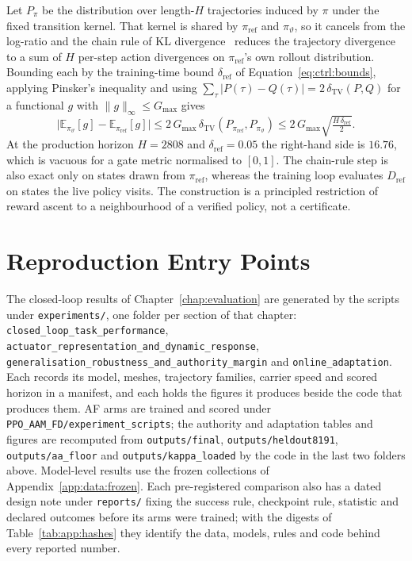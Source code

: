 Let $P_\pi$ be the distribution over length-$H$ trajectories induced by $\pi$
under the fixed transition kernel. That kernel is shared by
$\pi_{\mathrm{ref}}$ and $\pi_\vartheta$, so it cancels from the log-ratio and
the chain rule of KL divergence~\cite{cover2006information} reduces the
trajectory divergence to a sum of $H$ per-step action divergences on
$\pi_{\mathrm{ref}}$'s own rollout distribution. Bounding each by the
training-time bound $\delta_{\mathrm{ref}}$ of
Equation~\eqref{eq:ctrl:bounds}, applying Pinsker's inequality and using
$\sum_\tau |P(\tau)-Q(\tau)| = 2\,\delta_{\mathrm{TV}}(P,Q)$ for a functional
$g$ with $\|g\|_\infty \le G_{\max}$ gives
%
\begin{equation}
  \bigl|\mathbb{E}_{\pi_\vartheta}[g] - \mathbb{E}_{\pi_{\mathrm{ref}}}[g]\bigr|
  \le 2\,G_{\max}\,
     \delta_{\mathrm{TV}}(P_{\pi_{\mathrm{ref}}}, P_{\pi_\vartheta})
  \le 2\,G_{\max}\sqrt{\tfrac{H\,\delta_{\mathrm{ref}}}{2}} .
  \label{eq:app:final-bound}
\end{equation}
%
At the production horizon $H = 2808$ and $\delta_{\mathrm{ref}} = 0.05$ the
right-hand side is $16.76$, which is vacuous for a gate metric normalised to
$[0,1]$. The chain-rule step is also exact only on states drawn from
$\pi_{\mathrm{ref}}$, whereas the training loop evaluates $D_{\mathrm{ref}}$ on
states the live policy visits. The construction is a principled restriction of
reward ascent to a neighbourhood of a verified policy, not a certificate.

\section{Reproduction Entry Points}
\label{app:repro}

\sloppypar
The closed-loop results of Chapter~\ref{chap:evaluation} are generated by the
scripts under \texttt{experiments/}, one folder per section of that chapter:
\texttt{closed\_loop\_task\_performance},
\texttt{actuator\_representation\_and\_dynamic\_response},
\texttt{generalisation\_robustness\_and\_authority\_margin} and
\texttt{online\_adaptation}. Each records its model, meshes, trajectory
families, carrier speed and scored horizon in a manifest, and each holds the
figures it produces beside the code that produces them. AF arms are trained
and scored under \texttt{PPO\_AAM\_FD/experiment\_scripts}; the authority and
adaptation tables and figures are recomputed from \texttt{outputs/final},
\texttt{outputs/heldout8191}, \texttt{outputs/aa\_floor} and
\texttt{outputs/kappa\_loaded} by the code in the last two folders above. Model-level results use the frozen collections of
Appendix~\ref{app:data:frozen}. Each pre-registered comparison also has a dated
design note under \texttt{reports/} fixing the success rule, checkpoint rule,
statistic and declared outcomes before its arms were trained; with the digests
of Table~\ref{tab:app:hashes} they identify the data, models, rules and code
behind every reported number.
